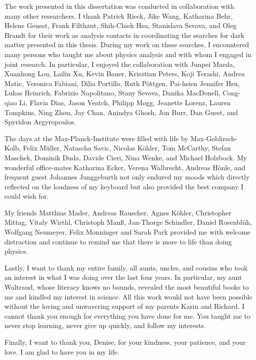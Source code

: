 The work presented in this dissertation was conducted in collaboration with many other researchers.
I thank Patrick Rieck, Jike Wang, Katharina Behr, Helene Genest, Frank Filthaut, Shih-Chieh Hsu, Stanislava Sevova, and Oleg Brandt for their work as analysis contacts in coordinating the searches for dark matter presented in this thesis.
During my work on these searches, I encountered many persons who taught me about physics analysis and with whom I engaged in joint research. In particular, I enjoyed the collaboration with %
Junpei Maeda, %
Xuanhong Lou, Lailin Xu, Kevin Bauer, Krisztian Peters, Koji Terashi, %
Andrea Matic, Veronica Fabiani, Dilia Portillo, Ruth Pöttgen, Pai-hsien Jennifer Hsu, %
Lukas Heinrich, Fabrizio Napolitano, %
Stany Sevova, Danika MacDonell, Cong-qiao Li, Flavia Dias, Jason Veatch, Philipp Mogg, Jeanette Lorenz, Lauren Tompkins, Ning Zhou, %
Jay Chan, Anindya Ghosh, Jon Burr, Dan Guest, and Spyridon Argyropoulos.

The days at the Max-Planck-Institute were filled with life by Max-Goblirsch-Kolb, Felix Müller, Natascha Savic, Nicolas Köhler, Tom McCarthy, Stefan Maschek, Dominik Duda, Davide Cieri, Nina Wenke, and Michael Holzbock. My wonderful office-mates Katharina Ecker, Verena Walbrecht, Andreas Hönle, and frequent guest Johannes Junggeburth not only endured my moods which directly reflected on the loudness of my keyboard but also provided the best company I could wish for.

My friends Matthias Mader, Andreas Rauscher, Agnes Köhler, Christopher Mittag, Vitaly Wirthl, Christoph Manß, Jan-Thorge Schindler, Daniel Rosenblüh, Wolfgang Neumeyer, Felix Monninger and Sarah Park provided me with welcome distraction and continue to remind me that there is more to life than doing physics.

Lastly, I want to thank my entire family, all aunts, uncles, and cousins who took an interest in what I was doing over the last four years.
In particular, my aunt Waltraud, whose literacy knows no bounds, revealed the most beautiful books to me and kindled my interest in science.
All this work would not have been possible without the loving and unwavering support of my parents Karin and Richard. I cannot thank you enough for everything you have done for me. You taught me to never stop learning, never give up quickly, and follow my interests.

Finally, I want to thank you, Denise, for your kindness, your patience, and your love. I am glad to have you in my life.
